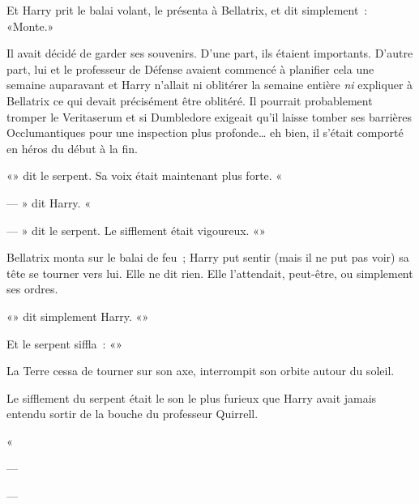 Et Harry prit le balai volant, le présenta à Bellatrix, et dit simplement~: «Monte.»

Il avait décidé de garder ses souvenirs. D'une part, ils étaient importants. D'autre part, lui et le professeur de Défense avaient commencé à planifier cela une semaine auparavant et Harry n'allait ni oblitérer la semaine entière \emph{ni} expliquer à Bellatrix ce qui devait précisément être oblitéré. Il pourrait probablement tromper le Veritaserum et si Dumbledore exigeait qu'il laisse tomber ses barrières Occlumantiques pour une inspection plus profonde… eh bien, il s'était comporté en héros du début à la fin.

«» dit le serpent. Sa voix était maintenant plus forte. «

--- » dit Harry. «

--- » dit le serpent. Le sifflement était vigoureux. «»

Bellatrix monta sur le balai de feu~; Harry put sentir (mais il ne put pas voir) sa tête se tourner vers lui. Elle ne dit rien. Elle l'attendait, peut-être, ou simplement ses ordres.

«» dit simplement Harry. «»

Et le serpent siffla~: «»

La Terre cessa de tourner sur son axe, interrompit son orbite autour du soleil.

Le sifflement du serpent était le son le plus furieux que Harry avait jamais entendu sortir de la bouche du professeur Quirrell.

«

--- 

--- 


